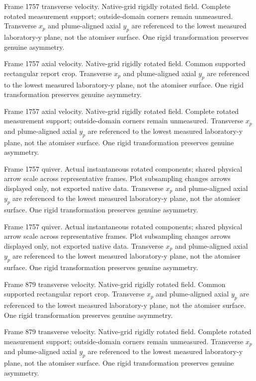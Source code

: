 \caption{Frame 1757 transverse velocity. Native-grid rigidly rotated field. Complete rotated measurement support; outside-domain corners remain unmeasured. Transverse $x_p$ and plume-aligned axial $y_p$ are referenced to the lowest measured laboratory-y plane, not the atomiser surface. One rigid transformation preserves genuine asymmetry.}

\caption{Frame 1757 axial velocity. Native-grid rigidly rotated field. Common supported rectangular report crop. Transverse $x_p$ and plume-aligned axial $y_p$ are referenced to the lowest measured laboratory-y plane, not the atomiser surface. One rigid transformation preserves genuine asymmetry.}

\caption{Frame 1757 axial velocity. Native-grid rigidly rotated field. Complete rotated measurement support; outside-domain corners remain unmeasured. Transverse $x_p$ and plume-aligned axial $y_p$ are referenced to the lowest measured laboratory-y plane, not the atomiser surface. One rigid transformation preserves genuine asymmetry.}

\caption{Frame 1757 quiver. Actual instantaneous rotated components; shared physical arrow scale across representative frames. Plot subsampling changes arrows displayed only, not exported native data. Transverse $x_p$ and plume-aligned axial $y_p$ are referenced to the lowest measured laboratory-y plane, not the atomiser surface. One rigid transformation preserves genuine asymmetry.}

\caption{Frame 1757 quiver. Actual instantaneous rotated components; shared physical arrow scale across representative frames. Plot subsampling changes arrows displayed only, not exported native data. Transverse $x_p$ and plume-aligned axial $y_p$ are referenced to the lowest measured laboratory-y plane, not the atomiser surface. One rigid transformation preserves genuine asymmetry.}

\caption{Frame 879 transverse velocity. Native-grid rigidly rotated field. Common supported rectangular report crop. Transverse $x_p$ and plume-aligned axial $y_p$ are referenced to the lowest measured laboratory-y plane, not the atomiser surface. One rigid transformation preserves genuine asymmetry.}

\caption{Frame 879 transverse velocity. Native-grid rigidly rotated field. Complete rotated measurement support; outside-domain corners remain unmeasured. Transverse $x_p$ and plume-aligned axial $y_p$ are referenced to the lowest measured laboratory-y plane, not the atomiser surface. One rigid transformation preserves genuine asymmetry.}

